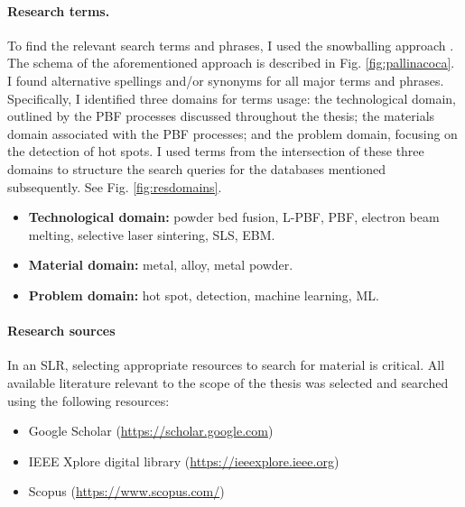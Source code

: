 \paragraph{Research terms.} To find the relevant search terms and phrases, I used the snowballing approach \cite{wohlin_guidelines_2014}. The schema of the aforementioned approach is described in Fig. \ref{fig:pallinacoca}. I found alternative spellings and/or synonyms for all major terms and phrases. Specifically, I identified three domains for terms usage: the technological domain, outlined by the PBF processes discussed throughout the thesis; the materials domain associated with the PBF processes; and the problem domain, focusing on the detection of hot spots. I used terms from the intersection of these three domains to structure the search queries for the databases mentioned subsequently. See Fig. \ref{fig:resdomains}.
\begin{itemize}
    \item \textbf{Technological domain:} powder bed fusion, L-PBF, PBF, electron beam melting, selective laser sintering, SLS, EBM.
    \item \textbf{Material domain:} metal, alloy, metal powder.
    \item \textbf{Problem domain:} hot spot, detection, machine learning, ML.
\end{itemize}

\paragraph{Research sources} In an SLR, selecting appropriate resources to search for material is critical. All available literature relevant to the scope of the thesis was selected and searched using the following resources:
\begin{itemize}
    \item Google Scholar (\href{https://scholar.google.com}{https://scholar.google.com})
    \item IEEE Xplore digital library (\href{https://ieeexplore.ieee.org}{https://ieeexplore.ieee.org})
    \item Scopus (\href{https://www.scopus.com/}{https://www.scopus.com/})
\end{itemize}

